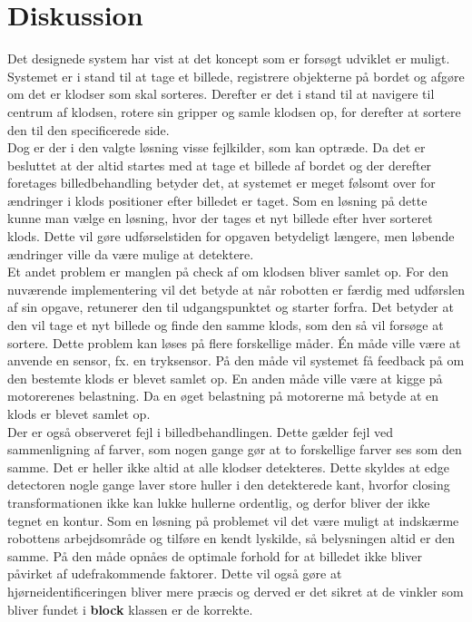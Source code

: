 \clearpage
\section{Diskussion}
Det designede system har vist at det koncept som er forsøgt udviklet er muligt. Systemet er i stand til at tage et billede, registrere objekterne på bordet og afgøre om det er klodser som skal sorteres. Derefter er det i stand til at navigere til centrum af klodsen, rotere sin gripper og samle klodsen op, for derefter at sortere den til den specificerede side.\\

Dog er der i den valgte løsning visse fejlkilder, som kan optræde. Da det er besluttet at der altid startes med at tage et billede af bordet og der derefter foretages billedbehandling betyder det, at systemet er meget følsomt over for ændringer i klods positioner efter billedet er taget. Som en løsning på dette kunne man vælge en løsning, hvor der tages et nyt billede efter hver sorteret klods. Dette vil gøre udførselstiden for opgaven betydeligt længere, men løbende ændringer ville da være mulige at detektere.\\ 

Et andet problem er manglen på check af om klodsen bliver samlet op. For den nuværende implementering vil det betyde at når robotten er færdig med udførslen af sin opgave, retunerer den til udgangspunktet og starter forfra. Det betyder at den vil tage et nyt billede og finde den samme klods, som den så vil forsøge at sortere. Dette problem kan løses på flere forskellige måder. Én måde ville være at anvende en sensor, fx. en tryksensor. På den måde vil systemet få feedback på om den bestemte klods er blevet samlet op. En anden måde ville være at kigge på motorerenes belastning. Da en øget belastning på motorerne må betyde at en klods er blevet samlet op.\\

Der er også observeret fejl i billedbehandlingen. Dette gælder fejl ved sammenligning af farver, som nogen gange gør at to forskellige farver ses som den samme. Det er heller ikke altid at alle klodser detekteres. Dette skyldes at edge detectoren nogle gange laver store huller i den detekterede kant, hvorfor closing transformationen ikke kan lukke hullerne ordentlig, og derfor bliver der ikke tegnet en kontur. Som en løsning på problemet vil det være muligt at indskærme robottens arbejdsområde og tilføre en kendt lyskilde, så belysningen altid er den samme. På den måde opnåes de optimale forhold for at billedet ikke bliver påvirket af udefrakommende faktorer. Dette vil også gøre at hjørneidentificeringen bliver mere præcis og derved er det sikret at de vinkler som bliver fundet i \textbf{block} klassen er de korrekte.\\

